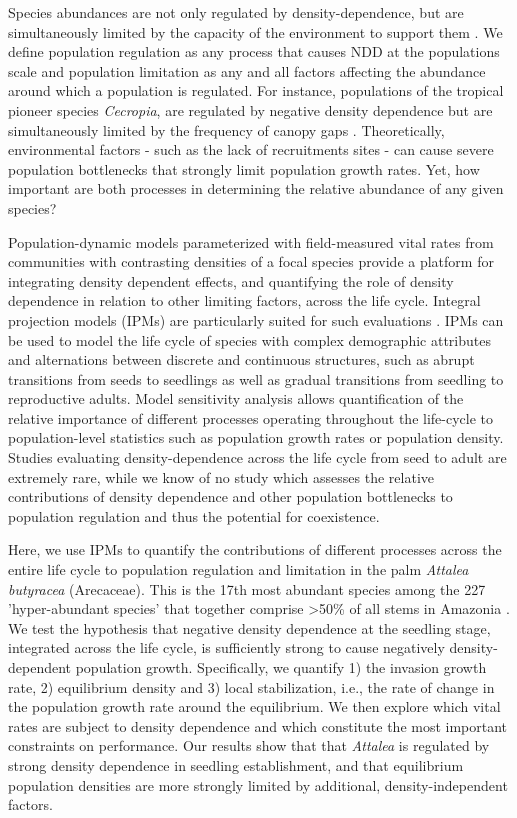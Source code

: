 \documentclass[b5paper,justified]{tufte-book} %
\begin{document}
\begin{fullwidth}
Species abundances are not only regulated by density-dependence, but are simultaneously limited by the capacity of the environment to support them \citep{Turchin1995}.  We define population regulation as any process that causes NDD at the populations scale and population limitation as any and all factors affecting the abundance around which a population is regulated.  For instance, populations of the tropical pioneer species \textit{Cecropia}, are regulated by negative density dependence but are simultaneously limited by the frequency of canopy gaps \citep{Alvarez-Buylla1994}. Theoretically, environmental factors - such as the lack of recruitments sites - can cause severe population bottlenecks that strongly limit population growth rates. Yet, how important are both processes in determining the relative abundance of any given species? 

Population-dynamic models parameterized with field-measured vital rates from communities with contrasting densities of a focal species provide a platform for integrating density dependent effects, and quantifying the role of density dependence in relation to other limiting factors, across the life cycle.  Integral projection models (IPMs) are particularly suited for such evaluations \citep{Ellner2006}. IPMs can be used to model the life cycle of species with complex demographic attributes and alternations between discrete and continuous structures, such as abrupt transitions from seeds to seedlings as well as gradual transitions from seedling to reproductive adults. Model sensitivity analysis \citep{Caswell2000, Rees2009} allows quantification of the relative importance of different processes operating throughout the life-cycle to population-level statistics such as population growth rates or population density.  Studies evaluating density-dependence across the life cycle from seed to adult are extremely rare, while we know of no study which assesses the relative contributions of density dependence and other population bottlenecks to population regulation and thus the potential for coexistence.  

Here, we use IPMs to quantify the contributions of different processes across the entire life cycle to population regulation and limitation in the palm \textit{Attalea butyracea} (Arecaceae).  This is the 17th most abundant species among the 227  'hyper-abundant species' that together comprise >50\% of all stems in Amazonia \citep{Steege2013}.  We test the hypothesis that negative density dependence at the seedling stage, integrated across the life cycle, is sufficiently strong to cause negatively density-dependent population growth. Specifically, we quantify 1) the invasion growth rate, 2) equilibrium density and 3) local stabilization, i.e., the rate of change in the population growth rate around the equilibrium.  We then explore which vital rates are subject to density dependence and which constitute the most important constraints on performance. Our results show that that \textit{Attalea} is regulated by strong density dependence in seedling establishment, and that equilibrium population densities are more strongly limited by additional, density-independent factors.


\end{fullwidth}
\end{document}
